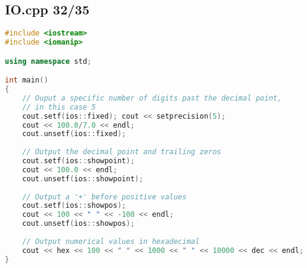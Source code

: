 \subsection{IO.cpp 32/35}
\begin{lstlisting}[language=C++]
#include <iostream>
#include <iomanip>

using namespace std;

int main()
{
    // Ouput a specific number of digits past the decimal point,
    // in this case 5    
    cout.setf(ios::fixed); cout << setprecision(5);
    cout << 100.0/7.0 << endl;
    cout.unsetf(ios::fixed);
    
    // Output the decimal point and trailing zeros
    cout.setf(ios::showpoint);
    cout << 100.0 << endl;
    cout.unsetf(ios::showpoint);
    
    // Output a '+' before positive values
    cout.setf(ios::showpos);
    cout << 100 << " " << -100 << endl;
    cout.unsetf(ios::showpos);
    
    // Output numerical values in hexadecimal
    cout << hex << 100 << " " << 1000 << " " << 10000 << dec << endl;
}

\end{lstlisting}
